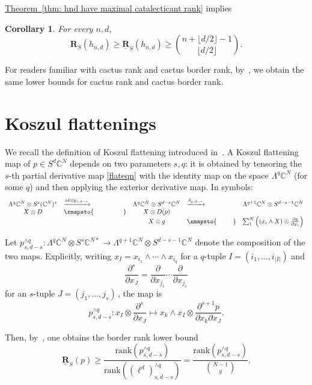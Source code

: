 \documentclass[11pt]{article}
\numberwithin{equation}{section}
\newtheorem{corollary}[theorem]{Corollary}
\theoremstyle{definition}
\theoremstyle{plain}
\newcommand{\expref}[2]{\hyperref[#2]{#1~\ref{#2}}}
\newcommand{\vvirg}{ , \dots , }
\providecommand{\textsum}{}
\renewcommand{\textsum}{{\textstyle \sum}}
\providecommand{\textfrac}{}
\renewcommand{\textfrac}[2]{{\textstyle \frac{#1}{#2}}}
\newcommand{\bfR}{\mathbf{R}}
\newcommand{\bbC}{\mathbb{C}}
\newcommand{\id}{\mathrm{id}}
\newcommand{\uline}[1]{\underline{#1}}
\def\BC{\mathbb C}
\def\ww{\wedge}
\def\trank{\mathrm{rank}}
\newcommand{\xto}[1]{\xrightarrow{#1}}
\begin{document}
\expref{Theorem}{thm: hnd have maximal catalecticant rank} implies
\begin{corollary}
For every $n,d$,  
 \[
\bfR_S(h_{n,d}) \geq  \uline{\bfR}_S(h_{n,d}) \geq \binom{n+\lfloor d/2 \rfloor -1}{\lfloor d/2 \rfloor}.
 \]
\end{corollary}
For readers familiar with cactus rank and cactus border rank, by~\cite[Thm. 5.3D]{MR1735271}, we obtain the same lower bounds for cactus rank and cactus border rank. 
 

\section{Koszul flattenings}
We recall the definition of Koszul flattening introduced in~\cite{MR3081636}. A Koszul flattening map of $p \in S^d \bbC^N$ depends on two parameters $s,q$: it is obtained by tensoring the $s$-th partial derivative map \eqref{flateqn} with the identity map on the space $\Lambda^q \BC^N$ (for some $q$) and then applying the exterior derivative map. In symbols: %
\begin{align*}
\begin{array}{clclc}
 \Lambda^q \bbC^N \otimes S^{s} (\bbC^N)^* &\xto{\id \otimes p_{s,d-s}} &\Lambda^q \bbC^N \otimes S^{d-s} \bbC^N & \xto{\delta_{q,d-s}}&\Lambda^{q+1} \bbC^N \otimes S^{d-s-1} \bbC^N \\
 X \otimes D &\xmapsto{\phantom{\id \otimes p_{s,d-s}}} & X \otimes D(p) & &  \\
 & &  X \otimes g & \xmapsto{\phantom{\delta_{q,d-s}}} &\textsum_1^N \left((x_i \wedge X) \otimes \textfrac{\partial g}{\partial x_i}\right)
\end{array}
 \end{align*}

 Let $p_{s,d-s}^{\ww q}:\Lambda^q \BC^N \otimes S^s\BC^{N*} \to \Lambda^{q+1}\BC^N\otimes S^{d-s-1}\BC^N$ denote the composition of the two maps. Explicitly, writing $x_I=x_{i_1}\ww \cdots \ww x_{i_{q}}$ for a $q$-tuple $I = (i_1 \vvirg i_{\vert I\vert})$ and
 \[
   \frac{\partial^{s}  }{\partial x_{J}}=\frac{\partial  }{\partial x_{j_1}}\cdots \frac{\partial  }{\partial x_{j_s}}
 \]
 for an $s$-tuple $J = (j_1 \vvirg j_s)$\,, the map is
\[
p_{s,d-s}^{\ww q}:  x_{I}\otimes \frac{\partial^{s}  }{\partial x_{J}}
\mapsto x_k\ww x_I\otimes \frac{\partial^{s+1} p }{\partial x_k \partial x_{J}}.
\]


Then, by~\cite[Prop 4.1.1]{MR3081636}, one obtains the border rank lower bound
\begin{equation}\label{eqn: Koszul flat bound for border rank}
\uline{\bfR}_S(p)\geq \frac{\trank(p_{s,d-s}^{\ww q})}{\trank((\ell^d)_{s,d-s}^{\ww q})}= \frac{\trank(p_{s,d-s}^{\ww q})}
{\binom{N-1}{q}}.
\end{equation}
\end{document}

